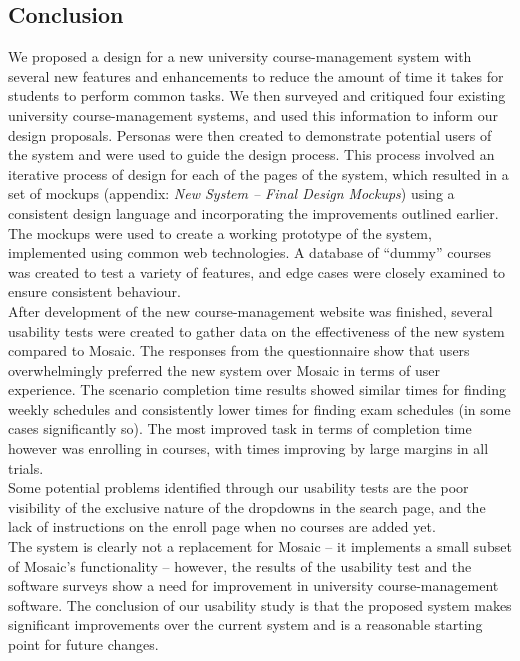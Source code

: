 \documentclass[10pt]{article}
\begin{document}
\begin{multicols}{2}
\section*{Conclusion}
We proposed a design for a new university course-management system with several new features and enhancements to reduce the amount of time it takes for students to perform common tasks. We then surveyed and critiqued four existing university course-management systems, and used this information to inform our design proposals. Personas were then created to demonstrate potential users of the system and were used to guide the design process. This process involved an iterative process of design for each of the pages of the system, which resulted in a set of mockups (appendix: \emph{New System -- Final Design Mockups}) using a consistent design language and incorporating the improvements outlined earlier.\\

The mockups were used to create a working prototype of the system, implemented using common web technologies. A database of ``dummy'' courses was created to test a variety of features, and edge cases were closely examined to ensure consistent behaviour.\\

After development of the new course-management website was finished, several usability tests were created to gather data on the effectiveness of the new system compared to Mosaic. The responses from the questionnaire show that users overwhelmingly preferred the new system over Mosaic in terms of user experience. The scenario completion time results showed similar times for finding weekly schedules and consistently lower times for finding exam schedules (in some cases significantly so). The most improved task in terms of completion time however was enrolling in courses, with times improving by large margins in all trials.\\

Some potential problems identified through our usability tests are the poor visibility of the exclusive nature of the dropdowns in the search page, and the lack of instructions on the enroll page when no courses are added yet.\\

The system is clearly not a replacement for Mosaic -- it implements a small subset of Mosaic's functionality -- however, the results of the usability test and the software surveys show a need for improvement in university course-management software. The conclusion of our usability study is that the proposed system makes significant improvements over the current system and is a reasonable starting point for future changes.

\end{multicols}
\end{document}
